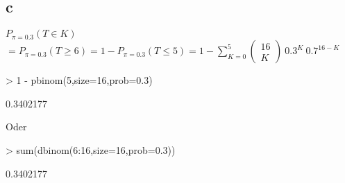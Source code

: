 \subsection{c}
$P_{\pi=0.3}(T \in K)$\\
$ = P_{\pi=0.3}(T \geq 6) = 1 - P_{\pi=0.3}(T \leq 5) 
= 1 - \sum_{K=0}^{5}\left(\begin{array}{l}16\\K\end{array}\right) 
~ 0.3^K ~ 0.7^{16-K}$
\begin{Schunk}
\begin{Sinput}
> 1 - pbinom(5,size=16,prob=0.3)
\end{Sinput}
\begin{Soutput}
[1] 0.3402177
\end{Soutput}
\end{Schunk}
Oder
\begin{Schunk}
\begin{Sinput}
> sum(dbinom(6:16,size=16,prob=0.3))
\end{Sinput}
\begin{Soutput}
[1] 0.3402177
\end{Soutput}
\end{Schunk}

